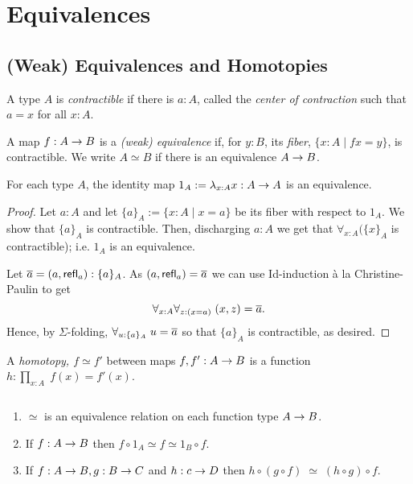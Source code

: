 \chapter{Equivalences}
\label{cha:equivalences}

\section{(Weak) Equivalences and Homotopies}
\begin{defn}\label{defn:contractible} A type $A$ is {\em contractible} if there is $a:A$, called the {\em center of contraction} such that $a=x$ for all $x:A$.
\end{defn}
\begin{defn}\label{defn:equivalence} A map $f:A\rightarrow B$ is a {\em (weak) equivalence}
if, for $y:B$, its {\em fiber}, $\{x:A\mid fx = y\}$, is contractible.
We write $A\simeq B$ if  there is an equivalence $A\rightarrow B$.
\end{defn}


\begin{lem}\label{lem:id-map}  For each type $A$, the identity map 
$1_A:= \lambda_{x:A}x :A\rightarrow A$ is an equivalence.
\end{lem}
\begin{proof}  Let $a:A$ and let $\{ a\}_A:= \{ x:A\mid x=a\}$ be its fiber with respect to $1_A$.  We show that $\{ a\}_A$ is contractible.  Then, discharging $a:A$ we get that $\forall_{x:A}(\{ x\}_A$ is contractible); i.e. $1_A$ is an equivalence.

Let $\overline{a} =(a,\mathsf{refl}_{a}):\{ a\}_A$.  As $(a,\mathsf{refl}_{a}) = \overline{a}$ we can use Id-induction \`{a} la Christine-Paulin to get
  \[\forall_{x:A}\forall_{z:(x=a)}\; (x,z)=\overline{a}.\]
Hence, by $\Sigma$-folding, $\forall_{u:\{ a\}_A}\; u=\overline{a}$ so that $\{ a\}_A$ is contractible, as desired.
\end{proof}
\begin{defn}\label{defn:homotopy-between-functions} A {\em homotopy, $f\simeq f'$} between maps $f,f':A\rightarrow B$ is a function $h:\prod_{x:A}\; f(x)=f'(x)$.  
\end{defn}
\begin{lem}\label{lem:homotopy-props} $\;$
\begin{enumerate}
\item $\simeq$ is an equivalence relation on each function type $A\rightarrow B$.
\item If $f:A\rightarrow B$ then $f\circ 1_A\simeq f\simeq 1_B\circ f$.
\item If $f:A\rightarrow B, g:B\rightarrow C$ and $h:c\rightarrow D$ then $h\circ (g\circ f)\;\simeq\; (h\circ g)\circ f$.
\end{enumerate}
\end{lem}
\newpage


